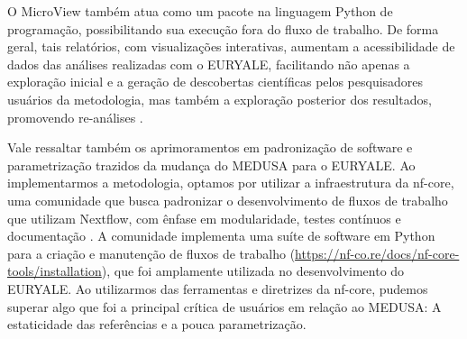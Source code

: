 \documentclass[
	12pt,				%
	oneside,			%
	a4paper,			%
	chapter=TITLE,		%
	section=TITLE,		%
	english,			%
	brazil				%
	]{abntex2}
\begin{document}
O MicroView também atua como um pacote na linguagem Python de programação, possibilitando sua execução fora do fluxo de trabalho. De forma geral, tais relatórios, com visualizações interativas, aumentam a acessibilidade de dados das análises realizadas com o EURYALE, facilitando não apenas a exploração inicial e a geração de descobertas científicas pelos pesquisadores usuários da metodologia, mas também a exploração posterior dos resultados, promovendo re-análises \autocite{perkel2018}.

Vale ressaltar também os aprimoramentos em padronização de software e parametrização trazidos da mudança do MEDUSA para o EURYALE. Ao implementarmos a metodologia, optamos por utilizar a infraestrutura da nf-core, uma comunidade que busca padronizar o desenvolvimento de fluxos de trabalho que utilizam Nextflow, com ênfase em modularidade, testes contínuos e documentação \autocite{langerEmpoweringBioinformaticsCommunities2024} \autocite{ewels2020}. A comunidade implementa uma suíte de software em Python para a criação e manutenção de fluxos de trabalho (\url{https://nf-co.re/docs/nf-core-tools/installation}), que foi amplamente utilizada no desenvolvimento do EURYALE. Ao utilizarmos das ferramentas e diretrizes da nf-core, pudemos superar algo que foi a principal crítica de usuários em relação ao MEDUSA: A estaticidade das referências e a pouca parametrização.
\end{document}

